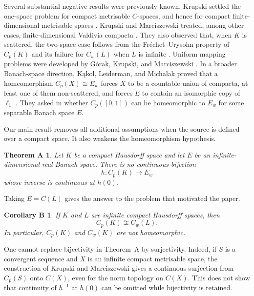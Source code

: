 \documentclass[a4paper]{amsart}
\newtheorem*{theoremA}{Theorem A}
\newtheorem*{corollaryB}{Corollary B}
\begin{document}
Several substantial negative results were previously known.  Krupski
settled the one-space problem for compact metrisable $C$-spaces, and
hence for compact finite-dimensional metrisable spaces
\cite[Corollary~1]{Krupski2016}.  Krupski and Marciszewski treated, among
other cases, finite-dimensional Valdivia compacta
\cite[Corollary~4.5]{KrupskiMarciszewski2017}.  They also observed that, when
$K$ is scattered, the two-space case follows from the
Fr\'{e}chet--Urysohn property of $C_p(K)$ and its failure for $C_w(L)$
when $L$ is infinite
\cite[item~(D), p.~648]{KrupskiMarciszewski2017}.  Uniform mapping
problems were developed by G\'{o}rak, Krupski, and Marciszewski
\cite{GorakKrupskiMarciszewski2019}.  In a broader Banach-space
direction, K\k{a}kol, Leiderman, and Michalak proved that a homeomorphism
$C_p(X)\cong E_w$ forces $X$ to be a countable union of compacta, at
least one of them non-scattered, and forces $E$ to contain an isomorphic
copy of $\ell_1$ \cite{KakolLeidermanMichalak2022}.  They asked in
\cite[Problem~3.10]{KakolLeidermanMichalak2022} whether $C_p([0,1])$ can be
homeomorphic to $E_w$ for some separable Banach space $E$.

Our main result removes all additional assumptions when the source is
defined over a compact space.  It also weakens the homeomorphism
hypothesis.

\begin{theoremA}
Let $K$ be a compact Hausdorff space and let $E$ be an
infinite-dimensional real Banach space.  There is no continuous
bijection
\[
                              h\colon C_p(K)\longrightarrow E_w
\]
whose inverse is continuous at $h(0)$.
\end{theoremA}

Taking $E=C(L)$ gives the answer to the problem that motivated the
paper.

\begin{corollaryB}
If $K$ and $L$ are infinite compact Hausdorff spaces, then
\[
                              C_p(K)\not\cong C_w(L).
\]
In particular, $C_p(K)$ and $C_w(K)$ are not homeomorphic.
\end{corollaryB}

One cannot replace bijectivity in Theorem~A by surjectivity.  Indeed, if
$S$ is a convergent sequence and $X$ is an infinite compact metrisable
space, the construction of Krupski and Marciszewski
\cite[Proposition~5.4]{KrupskiMarciszewski2016} gives a continuous
surjection from $C_p(S)$ onto $C(X)$, even for the norm topology on
$C(X)$.  This does not show that continuity of $h^{-1}$ at $h(0)$ can
be omitted while bijectivity is retained.
\end{document}
